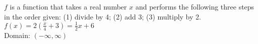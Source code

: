 {$f$ is a function that takes a real number $x$ and performs the following three steps in the order given: (1) divide by 4; (2) add 3; (3) multiply by 2.
}
{$f(x) = 2\left(\frac{x}{4} + 3\right) = \frac{1}{2} x + 6$ \\ Domain:  $(-\infty, \infty)$ }
